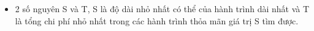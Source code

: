\begin{itemize}
	\item 2 số nguyên S và T, S là độ dài nhỏ nhất có thể của hành trình dài nhất và T là tổng chi phí nhỏ nhất trong các hành trình thỏa mãn giá trị S tìm được.
\end{itemize}